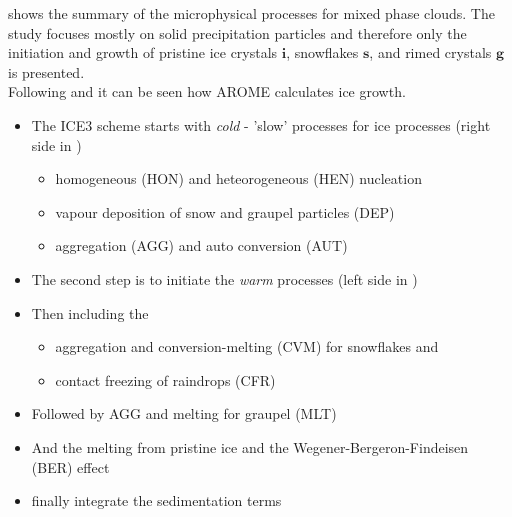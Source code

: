 %

\noindent
{} shows the summary of the microphysical processes for mixed phase clouds. The study focuses mostly on solid precipitation particles and therefore only the initiation and growth of pristine ice crystals $\mathbf{i}$, snowflakes $\mathbf{s}$, and rimed crystals $\mathbf{g}$ is presented. 
\\
Following \cite{pinty_mixed-phased_1998} and  it can be seen how AROME calculates ice growth. %
\begin{itemize}
\item The ICE3 scheme starts with \textit{cold} - 'slow' processes for ice processes (right side in ) 
	\begin{itemize}
	\item homogeneous (HON) and heteorogeneous (HEN) nucleation
    \item vapour deposition of snow and graupel particles (DEP)
    \item aggregation (AGG) and auto conversion (AUT)
	\end{itemize}
\item The second step is to initiate the \textit{warm} processes (left side in )
\item Then including the 
	\begin{itemize}
	\item aggregation and conversion-melting (CVM) for snowflakes and 
    \item contact freezing of raindrops (CFR)
	\end{itemize}
\item Followed by AGG and melting for graupel (MLT)
\item And the melting from pristine ice and the Wegener-Bergeron-Findeisen (BER) effect
\item finally integrate the sedimentation terms
\end{itemize}


